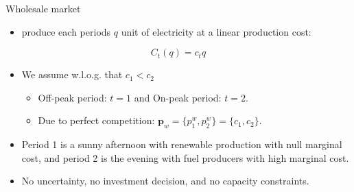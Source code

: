 \documentclass{class}
\begin{document}
\begin{frame}{Wholesale market}


\begin{itemize}
    \item {} produce each periods $q$ unit of electricity at a linear production cost: 
\end{itemize}

\begin{equation*}
    C_t(q) = c_t q
\end{equation*}

\vfill

\begin{itemize}
    \item We assume w.l.o.g. that $c_1 < c_2$

\vfill

\begin{itemize}
    \item Off-peak period: $t = 1$ and On-peak period: $t = 2$. \vfill
    \item Due to perfect competition: $\textbf{p}_w = \{p_1^w,p_2^w\} = \{c_1,c_2\}$.
\end{itemize}

\vfill

\item Period 1 is a sunny afternoon with renewable production with null marginal cost, and period 2 is the evening with fuel producers with high marginal cost.


\vfill

\item  No uncertainty, no investment decision, and no capacity constraints.

\end{itemize}
    
\end{frame}

\end{document}
